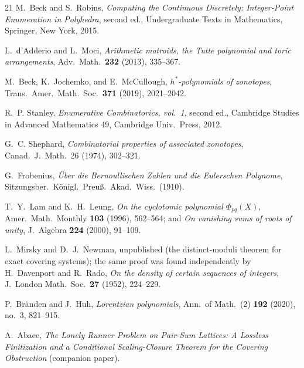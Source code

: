 \begin{thebibliography}{21}
M.~Beck and S.~Robins,
\emph{Computing the Continuous Discretely: Integer-Point Enumeration
in Polyhedra}, second ed.,
Undergraduate Texts in Mathematics, Springer, New York, 2015.

L.~d'Adderio and L.~Moci,
\emph{Arithmetic matroids, the Tutte polynomial and toric
arrangements},
Adv.\ Math.\ \textbf{232} (2013), 335--367.

M.~Beck, K.~Jochemko, and E.~McCullough,
\emph{$h^*$-polynomials of zonotopes},
Trans.\ Amer.\ Math.\ Soc.\ \textbf{371} (2019), 2021--2042.

R.~P. Stanley,
\emph{Enumerative Combinatorics, vol.~1}, second ed.,
Cambridge Studies in Advanced Mathematics 49, Cambridge Univ.\ Press,
2012.

G.~C. Shephard,
\emph{Combinatorial properties of associated zonotopes},
Canad.\ J.\ Math.\ 26 (1974), 302--321.

G.~Frobenius,
\emph{\"Uber die Bernoullischen Zahlen und die Eulerschen Polynome},
Sitzungsber.\ K\"onigl.\ Preu\ss.\ Akad.\ Wiss.\ (1910).

T.~Y.~Lam and K.~H.~Leung,
\emph{On the cyclotomic polynomial $\Phi_{pq}(X)$},
Amer.\ Math.\ Monthly \textbf{103} (1996), 562--564; and
\emph{On vanishing sums of roots of unity},
J.\ Algebra \textbf{224} (2000), 91--109.

L.~Mirsky and D.~J.~Newman,
unpublished (the distinct-moduli theorem for exact covering systems);
the same proof was found independently by
H.~Davenport and R.~Rado,
\emph{On the density of certain sequences of integers},
J.\ London Math.\ Soc.\ \textbf{27} (1952), 224--229.

P.~Br\"anden and J.~Huh,
\emph{Lorentzian polynomials},
Ann.\ of Math.\ (2) \textbf{192} (2020), no.~3, 821--915.

A.~Abaee,
\emph{The Lonely Runner Problem on Pair-Sum Lattices: A Lossless
Finitization and a Conditional Scaling-Closure Theorem for the
Covering Obstruction} (companion paper).

\end{thebibliography}
\endgroup
